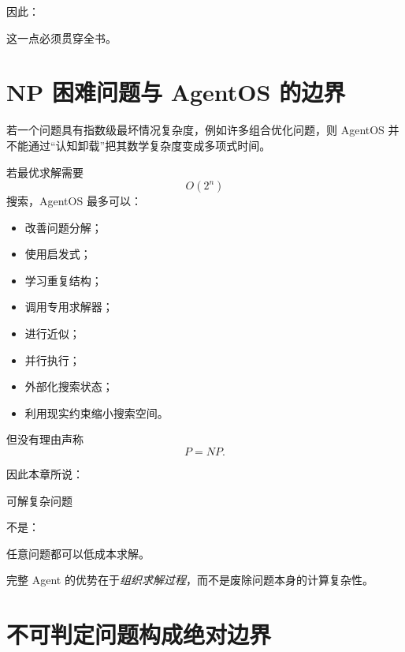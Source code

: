 因此：

\begin{statementbox}
\centering
{}
\end{statementbox}

这一点必须贯穿全书。

\section{NP 困难问题与 AgentOS 的边界}

若一个问题具有指数级最坏情况复杂度，例如许多组合优化问题，则 AgentOS 并不能通过“认知卸载”把其数学复杂度变成多项式时间。

若最优求解需要
\begin{equation}
O(2^n)
\end{equation}
搜索，AgentOS 最多可以：

\begin{itemize}
    \item 改善问题分解；
    \item 使用启发式；
    \item 学习重复结构；
    \item 调用专用求解器；
    \item 进行近似；
    \item 并行执行；
    \item 外部化搜索状态；
    \item 利用现实约束缩小搜索空间。
\end{itemize}

但没有理由声称
\begin{equation}
P=NP.
\end{equation}

因此本章所说：

\begin{statementbox}
可解复杂问题
\end{statementbox}

不是：

\begin{statementbox}
任意问题都可以低成本求解。
\end{statementbox}

完整 Agent 的优势在于\emph{组织求解过程}，而不是废除问题本身的计算复杂性。

\section{不可判定问题构成绝对边界}

